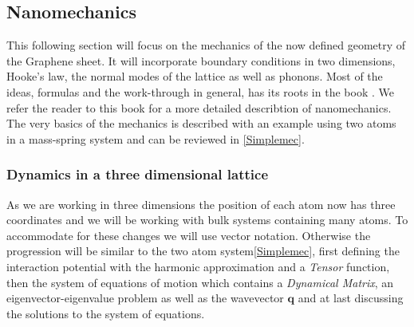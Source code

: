 
\subsection{Nanomechanics}
This following section will focus on the mechanics of the now defined geometry of the Graphene sheet. It will incorporate boundary conditions in two dimensions, Hooke's law, the normal modes of the lattice as well as phonons. Most of the ideas, formulas and the work-through in general, has its roots in the book . We refer the reader to this book for a more detailed describtion of nanomechanics. The very basics of the mechanics is described with an example using two atoms in a mass-spring system and can be reviewed in \cref{Simplemec}. 
\subsubsection{Dynamics in a three dimensional lattice} As we are working in three dimensions the position of each atom now has three coordinates and we will be working with bulk systems containing many atoms. To accommodate for these changes we will use vector notation. Otherwise the progression will be similar to the two atom system\cref{Simplemec}, first defining the interaction potential with the harmonic approximation and a \textit{Tensor} function, then the system of equations of motion which contains a \textit{Dynamical Matrix}, an eigenvector-eigenvalue problem as well as the wavevector $\textbf{q}$ and at last discussing the solutions to the system of equations.\\
